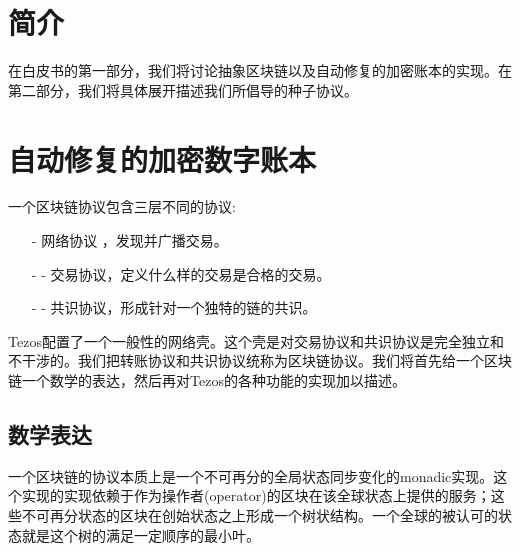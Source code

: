 \documentclass[letterpaper]{article}
\begin{document}
\tableofcontents
\newpage

\section{简介}

在白皮书的第一部分，我们将讨论抽象区块链以及自动修复的加密账本的实现。在第二部分，我们将具体展开描述我们所倡导的种子协议。

\section{自动修复的加密数字账本}

一个区块链协议包含三层不同的协议:
\begin{itemize}
\item[-] 网络协议 ，发现并广播交易。
\item[-] -	交易协议，定义什么样的交易是合格的交易。
\item[-] -	共识协议，形成针对一个独特的链的共识。
\end{itemize}


Tezos配置了一个一般性的网络壳。这个壳是对交易协议和共识协议是完全独立和不干涉的。我们把转账协议和共识协议统称为区块链协议。我们将首先给一个区块链一个数学的表达，然后再对Tezos的各种功能的实现加以描述。

\subsection{数学表达}

一个区块链的协议本质上是一个不可再分的全局状态同步变化的monadic实现。这个实现的实现依赖于作为操作者(operator)的区块在该全球状态上提供的服务；这些不可再分状态的区块在创始状态之上形成一个树状结构。一个全球的被认可的状态就是这个树的满足一定顺序的最小叶。
\end{document}
